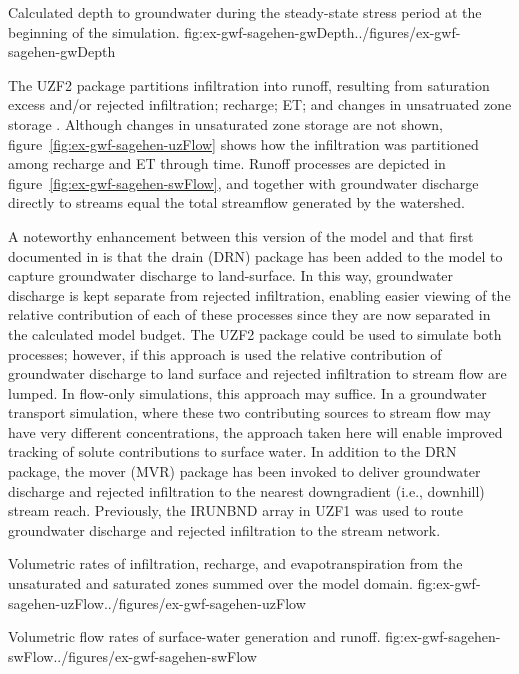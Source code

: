 \begin{StandardFigure}
	{Calculated depth to groundwater during the steady-state stress period at the beginning of the simulation.}
	{fig:ex-gwf-sagehen-gwDepth}{../figures/ex-gwf-sagehen-gwDepth}
\end{StandardFigure}

The UZF2 package partitions infiltration into runoff, resulting from saturation excess and/or rejected infiltration; recharge; ET; and changes in unsatruated zone storage \cite{modflow6software}.  Although changes in unsaturated zone storage are not shown, figure~\ref{fig:ex-gwf-sagehen-uzFlow} shows how the infiltration was partitioned among recharge and ET through time.  Runoff processes are depicted in figure~\ref{fig:ex-gwf-sagehen-swFlow}, and together with groundwater discharge directly to streams equal the total streamflow generated by the watershed.  

A noteworthy enhancement between this version of the model and that first documented in \citep{UZF} is that the drain (DRN) package has been added to the model to capture groundwater discharge to land-surface.  In this way, groundwater discharge is kept separate from rejected infiltration, enabling easier viewing of the relative contribution of each of these processes since they are now separated in the calculated model budget.  The UZF2 package could be used to simulate both processes; however, if this approach is used the relative contribution of groundwater discharge to land surface and rejected infiltration to stream flow are lumped.  In flow-only simulations, this approach may suffice.  In a groundwater transport simulation, where these two contributing sources to stream flow may have very different concentrations, the approach taken here will enable improved tracking of solute contributions to surface water.  In addition to the DRN package, the mover (MVR) package has been invoked to deliver groundwater discharge and rejected infiltration to the nearest downgradient (i.e., downhill) stream reach.  Previously, the IRUNBND array in UZF1 was used to route groundwater discharge and rejected infiltration to the stream network.

\begin{StandardFigure}
	{Volumetric rates of infiltration, recharge, and evapotranspiration from the unsaturated and saturated zones summed over the model domain.}
	{fig:ex-gwf-sagehen-uzFlow}{../figures/ex-gwf-sagehen-uzFlow}
\end{StandardFigure}

\begin{StandardFigure}
	{Volumetric flow rates of surface-water generation and runoff.}
	{fig:ex-gwf-sagehen-swFlow}{../figures/ex-gwf-sagehen-swFlow}
\end{StandardFigure}

